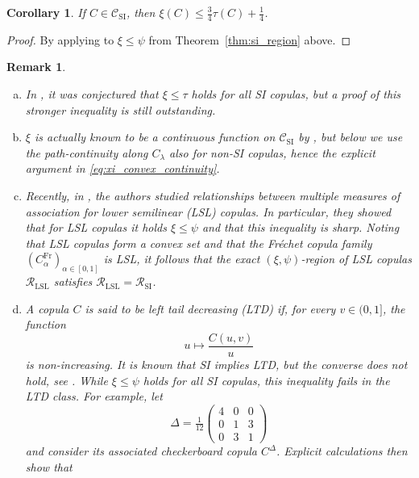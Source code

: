 \documentclass{article}
\newtheorem{corollary}[theorem]{Corollary}
\newtheorem{remark}[theorem]{Remark}
\newcommand{\1}{\mathds{1}}
\newcommand{\CC}{\mathcal{C}}  %
\begin{document}
\begin{corollary}
    If $C\in\CC_{\text{SI}}$, then
    \(
      \xi(C) \le \frac34 \tau(C) + \frac14
    \).
\end{corollary}

\begin{proof}
    By applying \cite[Thm.~4]{bukovvsek2023exact} to $\xi\le\psi$ from Theorem~\ref{thm:si_region} above.
\end{proof}

\begin{remark}
\leavevmode
\begin{enumerate}[(a)]
    \item In \cite{ansari2023dependence}, it was conjectured that $\xi \le \tau$ holds for all SI copulas, but a proof of this stronger inequality is still outstanding.
    \item $\xi$ is actually known to be a continuous function on $\CC_{\text{SI}}$ by \cite[Cor.~3.6]{ansari2025continuity}, but below we use the path-continuity along $C_\lambda$ also for non-SI copulas, hence the explicit argument in \eqref{eq:xi_convex_continuity}.
    \item Recently, in \cite{fuchs2025exact}, the authors studied relationships between multiple measures of association for \emph{lower semilinear (LSL)} copulas.
    In particular, they showed that for LSL copulas it holds $\xi\le\psi$ and that this inequality is sharp.
    Noting that LSL copulas form a convex set and that the Fréchet copula family $(C^{\text{Fr}}_\alpha)_{\alpha\in[0,1]}$ is LSL, it follows that the exact $(\xi,\psi)$-region of LSL copulas $\mathcal{R}_{\text{LSL}}$ satisfies $\mathcal{R}_{\text{LSL}}= \mathcal{R}_{\text{SI}}$.
    \item A copula $C$ is said to be \emph{left tail decreasing (LTD)} if, for every $v \in (0,1]$, the function 
    \[
        u \mapsto \frac{C(u,v)}{u}
    \]
    is non-increasing.
    It is known that SI implies LTD, but the converse does not hold, see \cite[Thm.~5.2.12]{Nelsen-2006}.
    While $\xi \le \psi$ holds for all SI copulas, this inequality fails in the LTD class.
    For example, let
    \[
        \Delta = \tfrac1{12}\begin{pmatrix}
            4 & 0 & 0 \\
            0 & 1 & 3 \\
            0 & 3 & 1
        \end{pmatrix}
    \]
    and consider its associated checkerboard copula \(C^{\Delta}\).
    Explicit calculations then show that

\end{enumerate}
\end{remark}
\end{document}
